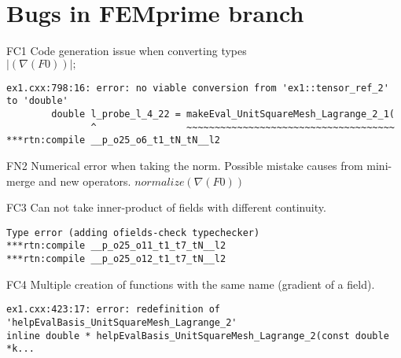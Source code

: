\section{Bugs in FEMprime branch}

\begin{description}
\item{FC1} Code generation issue when converting types\\
$|(\nabla(F0))|;$

\begin{lstlisting}[mathescape=true]
ex1.cxx:798:16: error: no viable conversion from 'ex1::tensor_ref_2' to 'double'
        double l_probe_l_4_22 = makeEval_UnitSquareMesh_Lagrange_2_1(
               ^                ~~~~~~~~~~~~~~~~~~~~~~~~~~~~~~~~~~~~~
***rtn:compile __p_o25_o6_t1_tN_tN__l2
\end{lstlisting}
\item{FN2}
Numerical error  when taking the norm. Possible mistake causes from mini-merge and new operators.
$normalize(\nabla(F0))$

\item{FC3} Can not take inner-product of fields with different continuity.
\begin{lstlisting}[mathescape=true]
Type error (adding ofields-check typechecker)
***rtn:compile __p_o25_o11_t1_t7_tN__l2
***rtn:compile __p_o25_o12_t1_t7_tN__l2
\end{lstlisting}
\item{FC4} Multiple creation of functions with the same name (gradient of a field).
\begin{lstlisting}[mathescape=true]
ex1.cxx:423:17: error: redefinition of 'helpEvalBasis_UnitSquareMesh_Lagrange_2'
inline double * helpEvalBasis_UnitSquareMesh_Lagrange_2(const double *k...
\end{lstlisting}
\end{description}
